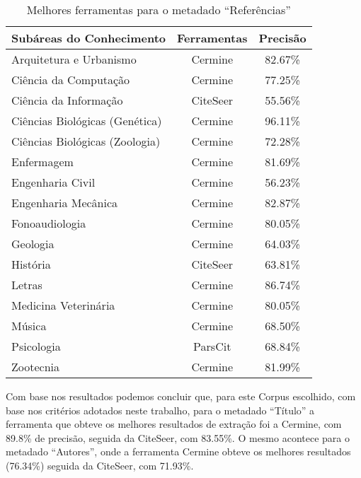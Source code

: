\begin{table}
    \caption{Melhores ferramentas para o metadado ``Referências''}
    \begin{center}
        \begin{tabular}{|l|c|c|}
            \hline 
            \textbf{Subáreas do Conhecimento} & \textbf{Ferramentas} & \textbf{Precisão} \\ 
            \hline 
            Arquitetura e Urbanismo & Cermine & 82.67\% \\ \hline
            Ciência da Computação & Cermine & 77.25\% \\ \hline
            Ciência da Informação & CiteSeer & 55.56\% \\ \hline
            Ciências Biológicas (Genética) & Cermine & 96.11\% \\ \hline
            Ciências Biológicas (Zoologia) & Cermine & 72.28\% \\ \hline
            Enfermagem & Cermine & 81.69\% \\ \hline
            Engenharia Civil & Cermine & 56.23\% \\ \hline
            Engenharia Mecânica & Cermine & 82.87\% \\ \hline
            Fonoaudiologia & Cermine & 80.05\% \\ \hline
            Geologia & Cermine & 64.03\% \\ \hline
            História & CiteSeer & 63.81\% \\ \hline
            Letras & Cermine & 86.74\% \\ \hline
            Medicina Veterinária & Cermine & 80.05\% \\ \hline
            Música & Cermine & 68.50\% \\ \hline
            Psicologia & ParsCit & 68.84\% \\ \hline
            Zootecnia & Cermine & 81.99\% \\ \hline
        \end{tabular}
    \end{center}
    \label{tab:areas-references-tools}
\end{table}

Com base nos resultados podemos concluir que, para este Corpus escolhido, com base nos critérios adotados neste trabalho, para o metadado ``Título'' a ferramenta que obteve os melhores resultados de extração foi a Cermine, com 89.8\% de precisão, seguida da CiteSeer, com 83.55\%. O mesmo acontece para o metadado ``Autores'', onde a ferramenta Cermine obteve os melhores resultados (76.34\%) seguida da CiteSeer, com 71.93\%.

